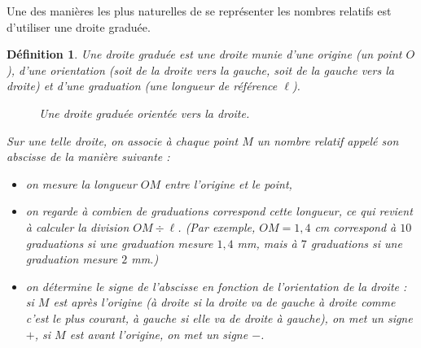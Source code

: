 \documentclass[12 pt]{article}
\theoremstyle{plain}
\newcounter{n}
\numberwithin{n}{section}
\newtheorem*{df}{Définition}
\begin{document}
Une des manières les plus naturelles de se représenter les nombres relatifs est d'utiliser une droite graduée. 
\begin{df}
Une droite graduée est une droite munie d'une origine (un point $O$), d'une orientation (soit de la droite vers la gauche, soit de la gauche vers la droite) et d'une graduation (une longueur 
de référence $\ell$). 

\begin{figure}[H]\center
{}
\caption{Une droite graduée orientée vers la droite.}
\end{figure}

Sur une telle droite, on associe à chaque point $M$ un nombre relatif appelé son \emph{abscisse} de la manière suivante :
\begin{itemize}
\item on mesure la longueur $OM$ entre l'origine et le point,
\item on regarde à combien de graduations correspond cette longueur, ce qui revient à calculer la division 
$OM\div \ell$. (Par exemple, $OM=1,4$ cm correspond à $10$ graduations si une graduation mesure $1,4$ mm, mais à $7$
graduations si une graduation mesure $2$ mm.)
\item on détermine le signe de l'abscisse en fonction de l'orientation de la droite : si $M$ est après l'origine (à droite si la droite va de gauche à droite comme c'est le plus courant, à gauche si elle va de droite à gauche), on 
met un signe $+$, si $M$ est avant l'origine, on met un signe $-$. 
\end{itemize}
\end{df}
\end{document}
